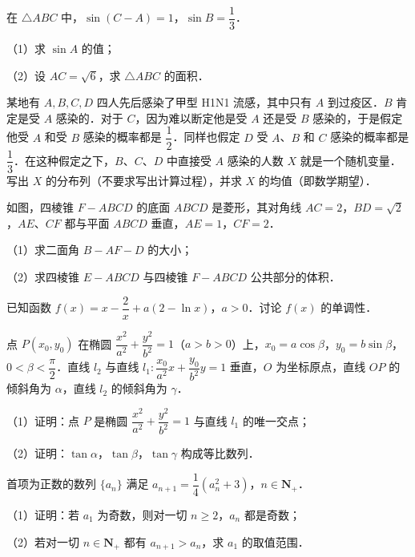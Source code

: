 \begin{question}
在 $\triangle ABC$ 中，$\sin(C-A)=1$，$\sin B=\dfrac13$．

（1）求 $\sin A$ 的值；

（2）设 $AC=\sqrt6$，求 $\triangle ABC$ 的面积．

\end{question}
\begin{question}
某地有 $A,B,C,D$ 四人先后感染了甲型 H1N1 流感，其中只有 $A$ 到过疫区．$B$ 肯定是受 $A$ 感染的．对于 $C$，因为难以断定他是受 $A$ 还是受 $B$ 感染的，于是假定他受 $A$ 和受 $B$ 感染的概率都是 $\dfrac12$．同样也假定 $D$ 受 $A$、$B$ 和 $C$ 感染的概率都是 $\dfrac13$．在这种假定之下，$B$、$C$、$D$ 中直接受 $A$ 感染的人数 $X$ 就是一个随机变量．写出 $X$ 的分布列（不要求写出计算过程），并求 $X$ 的均值（即数学期望）．

\Needspace{0.4\textheight}
\end{question}
\begin{question}
如图，四棱锥 $F-ABCD$ 的底面 $ABCD$ 是菱形，其对角线 $AC=2$，$BD=\sqrt2$，$AE$、$CF$ 都与平面 $ABCD$ 垂直，$AE=1$，$CF=2$．

（1）求二面角 $B-AF-D$ 的大小；

（2）求四棱锥 $E-ABCD$ 与四棱锥 $F-ABCD$ 公共部分的体积．
\nopagebreak[4]
\begin{center}\end{center}
\nopagebreak[4]
\end{question}
\begin{question}
已知函数 $f(x)=x-\dfrac2x+a(2-\ln x)$，$a>0$．讨论 $f(x)$ 的单调性．

\end{question}
\begin{question}
点 $P(x_0,y_0)$ 在椭圆 $\dfrac{x^2}{a^2}+\dfrac{y^2}{b^2}=1$（$a>b>0$）上，$x_0=a\cos\beta$，$y_0=b\sin\beta$，$0<\beta<\dfrac{\pi}{2}$．直线 $l_2$ 与直线 $l_1:\dfrac{x_0}{a^2}x+\dfrac{y_0}{b^2}y=1$ 垂直，$O$ 为坐标原点，直线 $OP$ 的倾斜角为 $\alpha$，直线 $l_2$ 的倾斜角为 $\gamma$．

（1）证明：点 $P$ 是椭圆 $\dfrac{x^2}{a^2}+\dfrac{y^2}{b^2}=1$ 与直线 $l_1$ 的唯一交点；

（2）证明：$\tan\alpha$，$\tan\beta$，$\tan\gamma$ 构成等比数列．

\end{question}
\begin{question}
首项为正数的数列 $\{a_n\}$ 满足 $a_{n+1}=\dfrac14\left(a_n^2+3\right)$，$n\in\mathbf N_+$．

（1）证明：若 $a_1$ 为奇数，则对一切 $n\geqslant2$，$a_n$ 都是奇数；

（2）若对一切 $n\in\mathbf N_+$ 都有 $a_{n+1}>a_n$，求 $a_1$ 的取值范围．

\end{question}